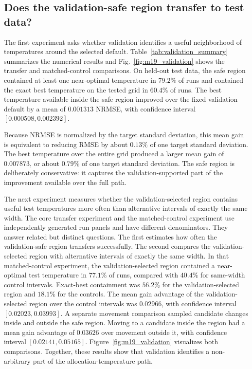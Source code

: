 \documentclass[preprint,12pt,authoryear]{elsarticle}
\begin{document}
\subsection{Does the validation-safe region transfer to test data?}

The first experiment asks whether validation identifies a useful neighborhood of temperatures around the selected default. Table~\ref{tab:validation_summary} summarizes the numerical results and Fig.~\ref{fig:m19_validation} shows the transfer and matched-control comparisons. On held-out test data, the safe region contained at least one near-optimal temperature in $79.2\%$ of runs and contained the exact best temperature on the tested grid in $60.4\%$ of runs. The best temperature available inside the safe region improved over the fixed validation default by a mean of $0.001313$ NRMSE, with confidence interval $[0.000508,0.002392]$.

Because NRMSE is normalized by the target standard deviation, this mean gain is equivalent to reducing RMSE by about $0.13\%$ of one target standard deviation. The best temperature over the entire grid produced a larger mean gain of $0.007873$, or about $0.79\%$ of one target standard deviation. The safe region is deliberately conservative: it captures the validation-supported part of the improvement available over the full path.

The next experiment measures whether the validation-selected region contains useful test temperatures more often than alternative intervals of exactly the same width. The core transfer experiment and the matched-control experiment use independently generated run panels and have different denominators. They answer related but distinct questions. The first estimates how often the validation-safe region transfers successfully. The second compares the validation-selected region with alternative intervals of exactly the same width. In that matched-control experiment, the validation-selected region contained a near-optimal test temperature in $77.1\%$ of runs, compared with $40.4\%$ for same-width control intervals. Exact-best containment was $56.2\%$ for the validation-selected region and $18.1\%$ for the controls. The mean gain advantage of the validation-selected region over the control intervals was $0.02966$, with confidence interval $[0.02023,0.03993]$. A separate movement comparison sampled candidate changes inside and outside the safe region. Moving to a candidate inside the region had a mean gain advantage of $0.03626$ over movement outside it, with confidence interval $[0.02141,0.05165]$. Figure~\ref{fig:m19_validation} visualizes both comparisons. Together, these results show that validation identifies a non-arbitrary part of the allocation-temperature path.
\end{document}
